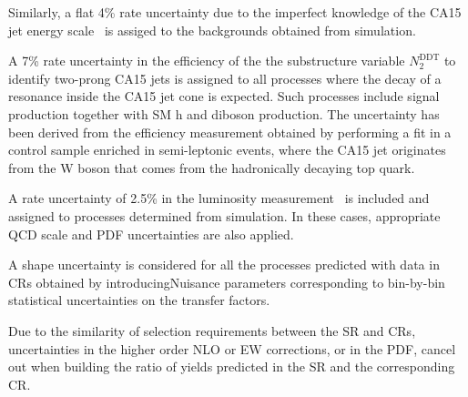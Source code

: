 Similarly, a flat 4\% rate uncertainty due to the imperfect knowledge of the CA15 jet energy scale~\cite{jec} is assiged to the backgrounds obtained from simulation.

A 7\% rate uncertainty in the efficiency of the the substructure variable
$N_2^\text{DDT}$ to identify two-prong CA15 jets is assigned to all processes where the decay of a resonance inside the CA15 jet cone is expected. Such processes include signal production together with SM h and diboson production.  
The uncertainty has been derived from the efficiency measurement obtained by performing a fit in a control sample
enriched in semi-leptonic \ttbar events, where the CA15 jet originates
from the W boson that comes from the hadronically decaying top quark. 
%

A rate uncertainty of 2.5\% in the luminosity measurement~\cite{CMS-PAS-LUM-17-001} is included and assigned to processes determined from simulation. In these cases, appropriate QCD scale and PDF uncertainties are also applied.
%

A shape uncertainty is considered for all the processes predicted with data in CRs obtained by introducingNuisance parameters corresponding to bin-by-bin statistical uncertainties on the transfer factors. 
%

Due to the similarity of selection requirements between the SR and CRs, uncertainties in the higher order NLO or EW corrections, or in the PDF, cancel out when building the ratio of yields predicted in the SR and the corresponding CR.


